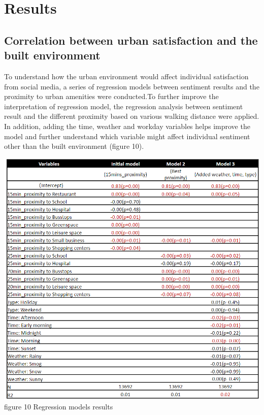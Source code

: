 \documentclass[
]{article}
\begin{document}
\hypertarget{results}{%
\section{Results}\label{results}}

\hypertarget{correlation-between-urban-satisfaction-and-the-built-environment}{%
\subsection{Correlation between urban satisfaction and the built
environment}\label{correlation-between-urban-satisfaction-and-the-built-environment}}

To understand how the urban environment would affect individual
satisfaction from social media, a series of regression models between
sentiment results and the proximity to urban amenities were conducted.To
further improve the interpretation of regression model, the regression
analysis between sentiment result and the different proximity based on
various walking distance were applied. In addition, adding the time,
weather and workday variables helps improve the model and further
understand which variable might affect individual sentiment other than
the built environment (figure 10).

\href{https://WTHSYZW.github.io/Thesis_2022/maps/models.png}{\includegraphics{maps/models.png}}
figure 10 Regression models results
\end{document}
